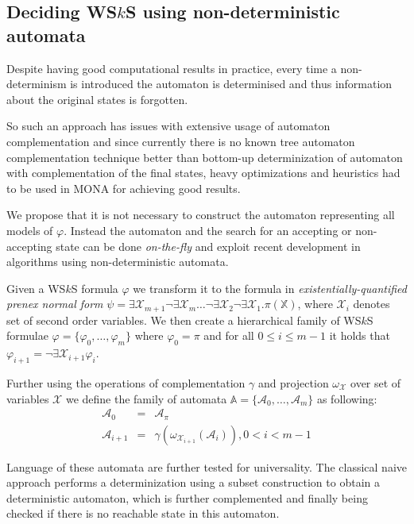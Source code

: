 \documentclass{eeict}
\begin{document}
\subsection{Deciding WS$k$S using non-deterministic automata}

Despite having good computational results in practice, every time a non-determinism is introduced the automaton
is determinised and thus information about the original states is forgotten.

So such an approach has issues with extensive usage of automaton complementation
and since currently there is no known tree automaton complementation technique
better than bottom-up determinization of automaton with complementation of the
final states, heavy optimizations and heuristics had to be used in MONA for
achieving good results.

We propose that it is not necessary to construct the automaton representing all
models of $\varphi$. Instead the automaton and the search for an accepting or
non-accepting state can be done \emph{on-the-fly} and exploit recent development
in algorithms using non-deterministic automata. 

Given a WS$k$S formula $\varphi$ we transform it to the formula in 
\emph{existentially-quantified prenex normal form} $\psi =
\exists\mathcal{X}_{m+1}\neg\exists\mathcal{X}_m\ldots\neg\exists\mathcal{X}_2\neg\exists\mathcal{X}_1.\pi(\mathds{X})$,
where $\mathcal{X}_i$ denotes set of second order variables.
We then create a hierarchical family of WS$k$S formulae $\varphi =
\{\varphi_0,\ldots,\varphi_m\}$ where $\varphi_0 = \pi$ and for all $0 \leq i \leq
m-1$ it holds that $\varphi_{i+1} = \neg\exists\mathcal{X}_{i+1}\varphi_i$. 

Further using the operations of complementation $\gamma$ and projection
$\omega_{\mathcal{X}}$ over set of variables $\mathcal{X}$ we define the family
of automata $\mathds{A} = \{\mathcal{A}_0,\ldots,\mathcal{A}_m\}$ as following:
\begin{eqnarray}
 \mathcal{A}_0 & = & \mathcal{A}_\pi\\
 \mathcal{A}_{i+1} & = & \gamma(\omega_{\mathcal{X}_{i+1}} (\mathcal{A}_i)), 0 <
 i < m - 1
\end{eqnarray}

Language of these automata are further tested for universality. The classical
naive approach performs a determinization using a subset construction to obtain
a deterministic automaton, which is further complemented and finally being
checked if there is no reachable state in this automaton.
\end{document}
